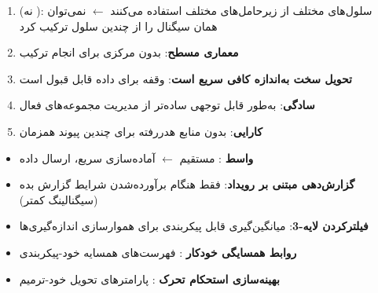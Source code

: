 \begin{enumerate}
\def\labelenumi{\arabic{enumi}.}
\tightlist
\item
   (نه ): سلول‌های مختلف از زیرحامل‌های مختلف استفاده می‌کنند \ensuremath{\leftarrow} نمی‌توان همان سیگنال را از چندین سلول ترکیب کرد
\item
  \textbf{معماری مسطح}: بدون  مرکزی برای انجام ترکیب
\item
  \textbf{تحویل سخت به‌اندازه کافی سریع است}: وقفه  برای داده قابل قبول است
\item
  \textbf{سادگی}: به‌طور قابل توجهی ساده‌تر از مدیریت مجموعه‌های فعال
\item
  \textbf{کارایی}: بدون منابع هدررفته برای چندین پیوند همزمان
\end{enumerate}


\begin{itemize}
\tightlist
\item
  \textbf{واسط }:  مستقیم \ensuremath{\leftarrow} آماده‌سازی سریع، ارسال داده
\item
  \textbf{گزارش‌دهی مبتنی بر رویداد}: فقط هنگام برآورده‌شدن شرایط گزارش بده (سیگنالینگ کمتر)
\item
  \textbf{فیلترکردن لایه-3}: میانگین‌گیری قابل پیکربندی برای هموارسازی اندازه‌گیری‌ها
\item
  \textbf{روابط همسایگی خودکار }: فهرست‌های همسایه خود-پیکربندی
\item
  \textbf{بهینه‌سازی استحکام تحرک }: پارامترهای تحویل خود-ترمیم
\end{itemize}




\CNchained{}




